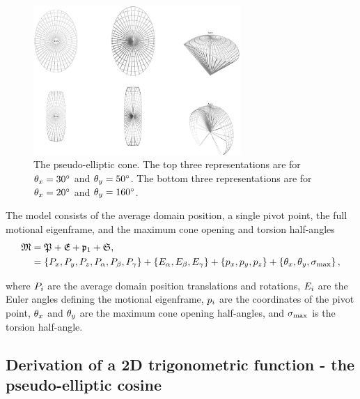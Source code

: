 \begin{figure}
  \centerline{
    \includegraphics[width=0.7\textwidth]{images/pseudo_elliptic_cone}
  }
  \caption[The pseudo-elliptic cone.]{
      The pseudo-elliptic cone.
      The top three representations are for $\theta_x = 30^\circ$ and $\theta_y = 50^\circ$.
      The bottom three representations are for $\theta_x = 20^\circ$ and $\theta_y = 160^\circ$.
  }
  \label{fig: pseudo-elliptic cone}
\end{figure}


The model consists of the average domain position, a single pivot point, the full motional eigenframe, and the maximum cone opening and torsion half-angles
\begin{subequations}
\begin{align}
    \mathfrak{M} &= \mathfrak{P} + \mathfrak{E} + \mathfrak{p}_1 + \mathfrak{S}, \\
              &= \left\{ P_x, P_y, P_z, P_\alpha, P_\beta, P_\gamma \right\} + \left\{ E_\alpha, E_\beta, E_\gamma \right\} + \left\{ p_x, p_y, p_z \right\} + \left\{ \theta_x, \theta_y, \sigma_\textrm{max} \right\} ,
\end{align}
\end{subequations}

where $P_i$ are the average domain position translations and rotations, $E_i$ are the Euler angles defining the motional eigenframe, $p_i$ are the coordinates of the pivot point, $\theta_x$ and $\theta_y$ are the maximum cone opening half-angles, and $\sigma_\textrm{max}$ is the torsion half-angle.




\subsection{Derivation of a 2D trigonometric function - the pseudo-elliptic cosine}

